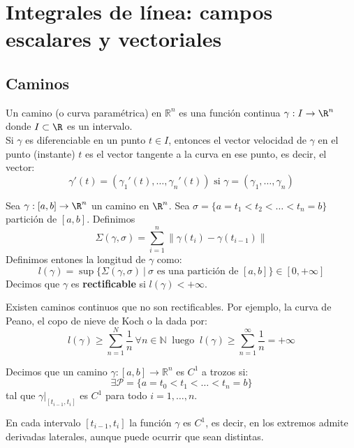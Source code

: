 \section{Integrales de línea: campos escalares y vectoriales}

\subsection{Caminos}

\begin{definición}[Camino]
Un camino (o curva paramétrica) en $\mathbb{R}^n$ es una función continua $\gamma: I \to \R^n$ donde $I \subset \R$ es un intervalo. \\
Si $\gamma$ es diferenciable en un punto $t \in I$, entonces el vector velocidad de $\gamma$ en el punto (instante) $t$ es el vector tangente a la curva en ese punto, es decir, el vector:
$$\gamma'(t) = (\gamma_1'(t), \ldots, \gamma_n'(t)) \text{ si } \gamma = (\gamma_1, \ldots, \gamma_n)$$
\end{definición}

\begin{definición}
Sea $\gamma: [a,b] \to \R^n$ un camino en $\R^n$. Sea $\sigma = \{a = t_1 < t_2 < \ldots < t_n = b\}$ partición de $[a,b]$. Definimos $$\Sigma(\gamma, \sigma) = \sum_{i = 1}^{n} \lVert \gamma(t_i) - \gamma(t_{i-1}) \rVert $$
Definimos entones la longitud de $\gamma$ como: $$l(\gamma) = \sup\{\Sigma(\gamma, \sigma) \ | \  \sigma \text{ es una partición de } [a, b]\} \in [0, + \infty]$$
Decimos que $\gamma$ es \textbf{rectificable} si $l(\gamma) < + \infty$.
\end{definición}

\begin{observación}
Existen caminos continuos que no son rectificables. Por ejemplo, la curva de Peano, el copo de nieve de Koch o la dada por:
$$l(\gamma) \geq \sum_{n = 1}^{N}\frac{1}{n} \ \forall n \in \mathbb{N} \ \text{  luego  } \ l(\gamma) \geq \sum_{n = 1}^{\infty}\frac{1}{n} = + \infty$$
\end{observación}

\begin{definición}
Decimos que un camino $\gamma: [a, b] \to \mathbb{R}^n$ es $C^1$ a trozos si:
$$\exists \mathcal{P} = \{a = t_0 < t_1 < \ldots < t_n = b\}$$ tal que $\gamma|_{[t_{i-1}, t_i]}$ es $C^1$ para todo $i = 1, \ldots, n$.
\end{definición}

\begin{observación}
En cada intervalo $[t_{i-1}, t_i]$ la función $\gamma$ es $C^1$, es decir, en los extremos admite derivadas laterales, aunque puede ocurrir que sean distintas.
\end{observación}

